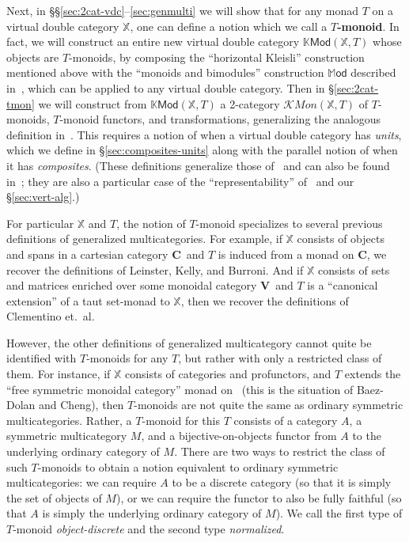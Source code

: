 \documentclass{tac}
\newcommand{\V}{\ensuremath{\mathbf{V}}}
\newcommand{\C}{\ensuremath{\mathbf{C}}}
\newcommand{\MOD}{\mathbb{M}\mathsf{od}}
\newcommand{\KMod}{\mathbb{K}\mathsf{Mod}}
\newcommand{\KMon}{\mathcal{K}\mathit{Mon}}
\numberwithin{equation}{section}
\begin{document}
Next, in \S\S\ref{sec:2cat-vdc}--\ref{sec:genmulti} we will show that
for any monad $T$ on a virtual double category $\mathbb{X}$, one can
define a notion which we call a \textbf{$T$-monoid}.  In fact, we will
construct an entire new virtual double category $\KMod(\mathbb{X},T)$
whose objects are $T$-monoids, by composing the ``horizontal Kleisli''
construction mentioned above with the ``monoids and bimodules''
construction $\MOD$ described in~\cite[\S5.3]{leinster:higher-opds},
which can be applied to any virtual double category.  Then in
\S\ref{sec:2cat-tmon} we will construct from $\KMod(\mathbb{X},T)$ a
2-category $\KMon(\mathbb{X},T)$ of $T$-monoids, $T$-monoid functors,
and transformations, generalizing the analogous definition
in~\cite[\S5.3]{leinster:higher-opds}.  This requires a notion of when a
virtual double category has \emph{units}, which we define in
\S\ref{sec:composites-units} along with the parallel notion of when it
has \emph{composites}.  (These definitions generalize those
of~\cite{HermidaRepresentable} and can also be found
in~\cite{dpp:paths-dbl}; they are also a particular case of the
``representability'' of~\cite{HermidaCoherent} and our
\S\ref{sec:vert-alg}.)

For particular $\mathbb{X}$ and $T$, the notion of $T$-monoid
specializes to several previous definitions of generalized
multicategories.  For example, if $\mathbb{X}$ consists of objects and
spans in a cartesian category \C\ and $T$ is induced from a monad on \C,
we recover the definitions of Leinster, Kelly, and Burroni.  And if
$\mathbb{X}$ consists of sets and matrices enriched over some monoidal
category \V\ and $T$ is a ``canonical extension'' of a taut set-monad to
$\mathbb{X}$, then we recover the definitions of Clementino et.\ al.

However, the other definitions of generalized multicategory cannot quite
be identified with $T$-monoids for any $T$, but rather with only a
restricted class of them.  For instance, if $\mathbb{X}$ consists of
categories and profunctors, and $T$ extends the ``free symmetric
monoidal category'' monad on \Cat\ (this is the situation of Baez-Dolan
and Cheng), then $T$-monoids are not quite the same as ordinary
symmetric multicategories.  Rather, a $T$-monoid for this $T$ consists
of a category $A$, a symmetric multicategory $M$, and a
bijective-on-objects functor from $A$ to the underlying ordinary
category of $M$.  There are two ways to restrict the class of such
$T$-monoids to obtain a notion equivalent to ordinary symmetric
multicategories: we can require $A$ to be a discrete category (so that
it is simply the set of objects of $M$), or we can require the functor
to also be fully faithful (so that $A$ is simply the underlying ordinary
category of $M$).  We call the first type of $T$-monoid
\emph{object-discrete} and the second type \emph{normalized}.
\end{document}
